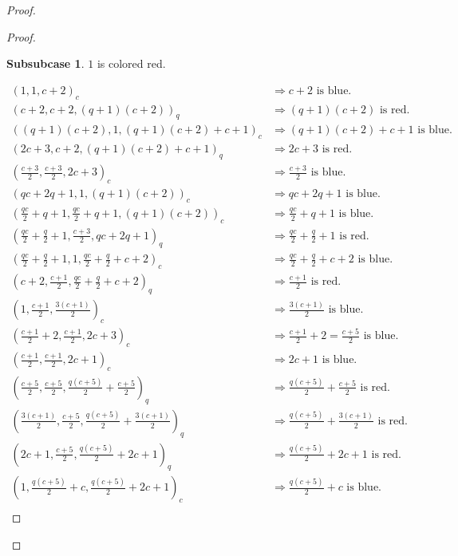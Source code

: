 \documentclass[preprint,12pt]{elsarticle}
\theoremstyle{plain}
\theoremstyle{definition}
\newtheorem{subsubcase}{Subsubcase}[subcase]
\begin{document}
\begin{proof}
\begin{proof}

\begin{subsubcase}
    $1$ is colored red.
\end{subsubcase}

\begin{align*}
(1,1,c+2)_c&\Longrightarrow c+2 \text{ is blue.}\\
(c+2,c+2,(q+1)(c+2))_q&\Longrightarrow (q+1)(c+2) \text{ is red.}\\
((q+1)(c+2),1, (q+1)(c+2)+c+1 )_c&\Longrightarrow (q+1)(c+2)+c+1 \text{ is blue.}\\
(2c+3,c+2,(q+1)(c+2)+c+1)_q&\Longrightarrow 2c+3 \text{ is red.}\\
\left(\tfrac{c+3}{2},\tfrac{c+3}{2},2c+3\right)_c&\Longrightarrow \tfrac{c+3}{2} \text{ is blue.}\\
(qc+2q+1,1,(q+1)(c+2))_c&\Longrightarrow qc+2q+1 \text{ is blue.}\\
\left(\tfrac{qc}{2}+q+1,\tfrac{qc}{2}+q+1,(q+1)(c+2)\right)_c&\Longrightarrow \tfrac{qc}{2}+q+1 \text{ is blue.}\\
(\tfrac{qc}{2}+\tfrac{q}{2}+1,\tfrac{c+3}{2},qc+2q+1)_q&\Longrightarrow \tfrac{qc}{2}+\tfrac{q}{2}+1 \text{ is red.}\\
(\tfrac{qc}{2}+\tfrac{q}{2}+1,1,\tfrac{qc}{2}+\tfrac{q}{2}+c+2)_c&\Longrightarrow \tfrac{qc}{2}+\tfrac{q}{2}+c+2 \text{ is blue.}\\
(c+2,\tfrac{c+1}{2},\tfrac{qc}{2}+\tfrac{q}{2}+c+2)_q&\Longrightarrow \tfrac{c+1}{2} \text{ is red.}\\
(1,\tfrac{c+1}{2},\tfrac{3(c+1)}{2})_c&\Longrightarrow \tfrac{3(c+1)}{2} \text{ is blue.}\\
(\tfrac{c+1}{2}+2,\tfrac{c+1}{2},2c+3)_c&\Longrightarrow \tfrac{c+1}{2}+2=\tfrac{c+5}{2} \text{ is blue.}\\
(\tfrac{c+1}{2},\tfrac{c+1}{2},2c+1)_c&\Longrightarrow 2c+1 \text{ is blue.}\\
(\tfrac{c+5}{2},\tfrac{c+5}{2},\tfrac{q(c+5)}{2}+\tfrac{c+5}{2})_q&\Longrightarrow \tfrac{q(c+5)}{2}+\tfrac{c+5}{2} \text{ is red.}\\
(\tfrac{3(c+1)}{2},\tfrac{c+5}{2},\tfrac{q(c+5)}{2}+\tfrac{3(c+1)}{2})_q&\Longrightarrow \tfrac{q(c+5)}{2}+\tfrac{3(c+1)}{2} \text{ is red.}\\
(2c+1,\tfrac{c+5}{2},\tfrac{q(c+5)}{2}+2c+1)_q&\Longrightarrow \tfrac{q(c+5)}{2}+2c+1 \text{ is red.}\\
(1,\tfrac{q(c+5)}{2}+c,\tfrac{q(c+5)}{2}+2c+1)_c&\Longrightarrow \tfrac{q(c+5)}{2}+c \text{ is blue.}\\

\end{align*}
\end{proof}
\end{proof}
\end{document}
